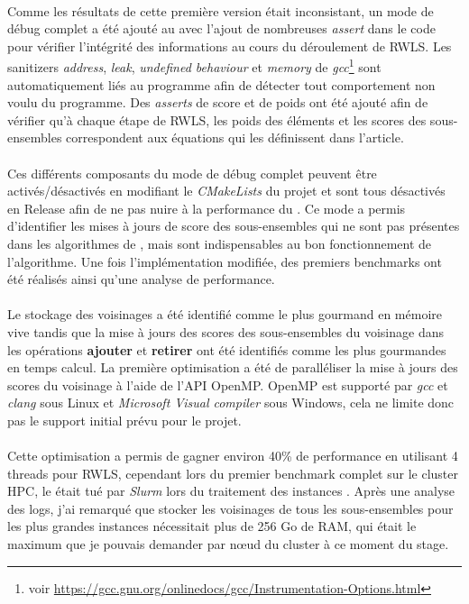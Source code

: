 \documentclass[a4paper,11pt,twoside,french,report]{../common/simplem}
\begin{document}
				\paragraph*{}
					Comme les résultats de cette première version était inconsistant, un mode de débug complet a été ajouté au \solver{} avec l'ajout de nombreuses \textit{assert} dans le code pour vérifier l'intégrité des informations au cours du déroulement de \gls{RWLS}. Les sanitizers \textit{address}, \textit{leak}, \textit{undefined behaviour} et \textit{memory} de \textit{gcc}\footnote{voir \url{https://gcc.gnu.org/onlinedocs/gcc/Instrumentation-Options.html}} sont automatiquement liés au programme afin de détecter tout comportement non voulu du programme. Des \textit{asserts} de score et de poids ont été ajouté afin de vérifier qu'à chaque étape de \gls{RWLS}, les poids des éléments et les scores des sous-ensembles correspondent aux équations qui les définissent dans l'article.
				\paragraph*{}
					Ces différents composants du mode de débug complet peuvent être activés/désactivés en modifiant le \textit{CMakeLists} du projet et sont tous désactivés en Release afin de ne pas nuire à la performance du \solver{}. Ce mode a permis d'identifier les mises à jours de score des sous-ensembles qui ne sont pas présentes dans les algorithmes de \cite{Gao2015}, mais sont indispensables au bon fonctionnement de l'algorithme. Une fois l'implémentation modifiée, des premiers benchmarks ont été réalisés ainsi qu'une analyse de performance.
				\paragraph*{}
					Le stockage des voisinages a été identifié comme le plus gourmand en mémoire vive tandis que la mise à jours des scores des sous-ensembles du voisinage dans les opérations \textbf{ajouter} et \textbf{retirer} ont été identifiés comme les plus gourmandes en temps calcul. La première optimisation a été de paralléliser la mise à jours des scores du voisinage à l'aide de l'\gls{API} \gls{OpenMP}. \gls{OpenMP} est supporté par \textit{gcc} et \textit{clang} sous Linux et \textit{Microsoft Visual \Cpp{} compiler} sous Windows, cela ne limite donc pas le support initial prévu pour le projet.
				\paragraph*{}
					Cette optimisation a permis de gagner environ 40\% de performance en utilisant 4 threads pour \gls{RWLS}, cependant lors du premier benchmark complet sur le cluster \gls{HPC}, le \solver{} était tué par \textit{Slurm} lors du traitement des instances . Après une analyse des logs, j'ai remarqué que stocker les voisinages de tous les sous-ensembles pour les plus grandes instances  nécessitait plus de 256 Go de RAM, qui était le maximum que je pouvais demander par nœud du cluster à ce moment du stage.
\end{document}
